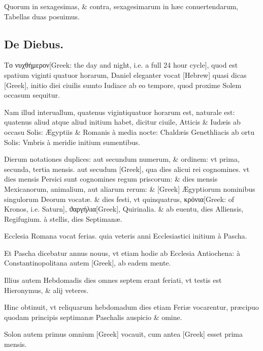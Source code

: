 \begin{parnumbers}

 Quorum in sexagesimas, \& contra, sexagesimarum in hæc conuertendarum, Tabellas duas posuimus.

\end{parnumbers}

\subsection{De Diebus.}
\setcounter{parcount}{0}
\begin{parnumbers}

\textgreek{Το νυχθήμερον[Greek: the day and night, i.e. a full 24 hour cycle]}, quod est spatium viginti quatuor horarum, Daniel eleganter vocat \texthebrew{[Hebrew]} quasi dicas \textgreek{[Greek]}, initio diei ciuilis sumto Iudiace ab eo tempore, quod proxime Solem occasum sequitur.

Nam illud interuallum, quatenus vigintiquatuor horarum est, naturale est: quatenus aliud atque aliud initium habet, dicitur ciuile, Atticis \& Iudæis ab occasu Solis: Ægyptiis \& Romanis à media nocte: Chaldæis Genethliacis ab ortu Solis: Vmbris à meridie initium  sumentibus.

Dierum notationes duplices: aut secundum numerum, \& ordinem: vt prima, secunda, tertia mensis. aut secudum \textgreek{[Greek]}, qua dies alicui rei cognomines. vt dies mensis Persici sunt cognomines regum priscorum: \& dies mensis Mexicanorum, animalium, aut aliarum rerum: \& \textgreek{[Greek]} Ægyptiorum nominibus singulorum Deorum vocatæ. \& dies festi, vt quinquatrus, \textgreek{κρόνια[Greek: of Kronos, i.e. Saturn]}, \textgreek{ϑαργήλια[Greek]}, Quirinalia. \& ab euentu, dies Alliensis, Regifugium. à stellis, dies Septimanæ.

Ecclesia Romana vocat ferias. quia veteris anni Ecclesiastici initium à Pascha.

Et Pascha dicebatur annus nouus, vt etiam hodie ab Ecclesia Antiochena: à Constantinopolitana autem \textgreek{[Greek]}, ab eadem mente.

Illius autem Hebdomadis dies omnes septem erant  feriati, vt testis est Hieronymus, \& alij veteres.

Hinc obtinuit, vt reliquarum hebdomadum dies etiam Feriæ vocarentur, præcipuo quodam principis septimanæ Paschalis auspicio \& omine.

Solon autem primus omnium \textgreek{[Greek]} vocauit, cum antea \textgreek{[Greek]} esset prima mensis.


\end{parnumbers}

